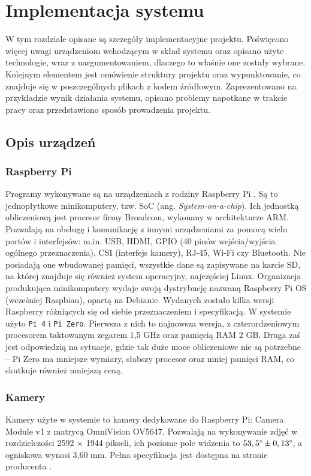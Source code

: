 \chapter{Implementacja systemu}
\thispagestyle{chapterBeginStyle}

W tym rozdziale opisane są szczegóły implementacyjne projektu. Poświęcono więcej uwagi urządzeniom wchodzącym w skład systemu oraz opisano użyte technologie, wraz z uargumentowaniem, dlaczego to właśnie one zostały wybrane. Kolejnym elementem jest omówienie struktury projektu oraz wypunktowanie, co znajduje się w poszczególnych plikach z kodem źródłowym. Zaprezentowano na przykładzie wynik działania systemu, opisano problemy napotkane w trakcie pracy oraz przedstawiono sposób prowadzenia projektu.

\section{Opis urządzeń}

\subsection{Raspberry Pi}
Programy wykonywane są na urządzeniach z rodziny Raspberry Pi \cite{RPi}. Są to jednopłytkowe minikomputery, tzw. SoC (ang. \textit{System-on-a-chip}). Ich jednostką obliczeniową jest procesor firmy Broadcom, wykonany w architekturze ARM. Pozwalają na obsługę i komunikację z innymi urządzeniami za pomocą wielu portów i interfejsów: m.in. USB, HDMI, GPIO (40 pinów wejścia/wyjścia ogólnego przeznaczenia), CSI (interfejs kamery), RJ-45, Wi-Fi czy Bluetooth. Nie posiadają one wbudowanej pamięci, wszystkie dane są zapisywane na karcie SD, na której znajduje się również system operacyjny, najczęściej Linux. Organizacja produkująca minikomputery wydaje swoją dystrybucję nazwaną Raspberry Pi OS (wcześniej Raspbian), opartą na Debianie. Wydanych zostało kilka wersji Raspberry różniących się od siebie przeznaczeniem i specyfikacją. W systemie użyto \verb|Pi 4| i \verb|Pi Zero|. Pierwsza z nich to najnowsza wersja, z czterordzeniowym procesorem taktowanym zegarem 1,5 GHz oraz pamięcią RAM 2 GB. Druga zaś jest odpowiedzią na sytuacje, gdzie tak duże moce obliczeniowe nie są potrzebne -- Pi Zero ma mniejsze wymiary, słabszy procesor oraz mniej pamięci RAM, co skutkuje również mniejszą ceną.
\subsection{Kamery}
Kamery użyte w systemie to kamery dedykowane do Raspberry Pi: Camera Module v1 z matrycą OmniVision OV5647. Pozwalają na wykonywanie zdjęć w rozdzielczości 2592 $\times$ 1944 pikseli, ich poziome pole widzenia to $53,5 \degree \pm 0,13 \degree$, a ogniskowa wynosi 3,60 mm. Pełna specyfikacja jest dostępna na stronie producenta \cite{RPi}.

